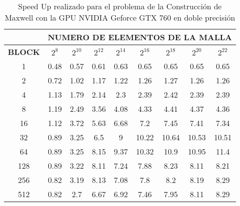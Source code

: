 \begin{table}[h!]
    \begin{tabular}{|c|c|c|c|c|c|c|c|c|}
    \hline
                   & \multicolumn{8}{c|}{\textbf{NUMERO DE ELEMENTOS DE LA MALLA}} \\ \hline
    \textbf{BLOCK} & $2^8$ & $2^10$& $2^12$& $2^14$& $2^16$& $2^18$& $2^20$& $2^22$\\ \hline
    1              & 0.48  & 0.57  & 0.61  & 0.63  & 0.65  & 0.65  & 0.65  & 0.65  \\ \hline
    2              & 0.72  & 1.02  & 1.17  & 1.22  & 1.26  & 1.27  & 1.26  & 1.26  \\ \hline
    4              & 1.13  & 1.79  & 2.14  & 2.3   & 2.39  & 2.42  & 2.39  & 2.39  \\ \hline
    8              & 1.19  & 2.49  & 3.56  & 4.08  & 4.33  & 4.41  & 4.37  & 4.36  \\ \hline
    16             & 1.12  & 3.72  & 5.63  & 6.68  & 7.2   & 7.45  & 7.41  & 7.34  \\ \hline
    32             & 0.89  & 3.25  & 6.5   & 9     & 10.22 & 10.64 & 10.53 & 10.51 \\ \hline
    64             & 0.89  & 3.25  & 8.15  & 9.37  & 10.32 & 10.9  & 10.95 & 11.4  \\ \hline
    128            & 0.89  & 3.22  & 8.11  & 7.24  & 7.88  & 8.23  & 8.11  & 8.21  \\ \hline
    256            & 0.82  & 3.19  & 8.13  & 7.08  & 7.8   & 8.2   & 8.19  & 8.29  \\ \hline
    512            & 0.82  & 2.7   & 6.67  & 6.92  & 7.46  & 7.95  & 8.11  & 8.29  \\ \hline
    \end{tabular}
    \caption{Speed Up realizado para el problema de la Construcción de Maxwell con la GPU NVIDIA Geforce GTX 760 en doble precisión}
    \label{tab:s_760_MxC_double_10}
    \end{table}